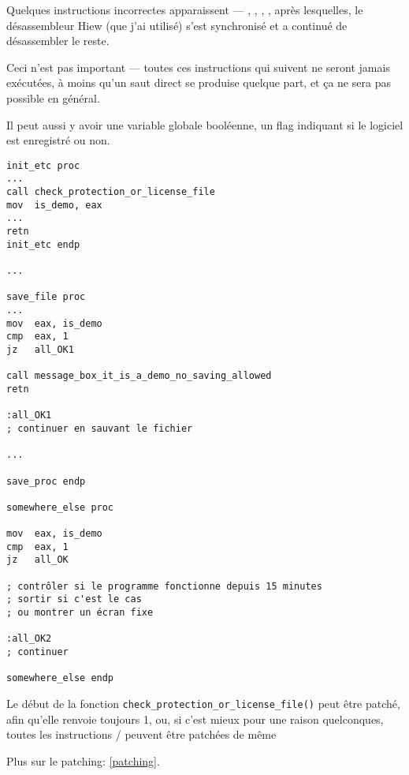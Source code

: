 Quelques instructions incorrectes apparaissent --- , , , ,
après lesquelles, le désassembleur Hiew (que j'ai utilisé) s'est synchronisé et
a continué de désassembler le reste.

Ceci n'est pas important --- toutes ces instructions qui suivent  ne
seront jamais exécutées, à moins qu'un saut direct se produise quelque part, et
ça ne sera pas possible en général.

\myhrule{}

Il peut aussi y avoir une variable globale booléenne, un flag indiquant si le
logiciel est enregistré ou non.

\begin{lstlisting}[style=customasmx86]
init_etc proc
...
call check_protection_or_license_file
mov  is_demo, eax
...
retn
init_etc endp

...

save_file proc
...
mov  eax, is_demo
cmp  eax, 1
jz   all_OK1

call message_box_it_is_a_demo_no_saving_allowed
retn

:all_OK1
; continuer en sauvant le fichier

...

save_proc endp

somewhere_else proc

mov  eax, is_demo
cmp  eax, 1
jz   all_OK

; contrôler si le programme fonctionne depuis 15 minutes
; sortir si c'est le cas
; ou montrer un écran fixe

:all_OK2
; continuer

somewhere_else endp
\end{lstlisting}

Le début de la fonction \verb|check_protection_or_license_file()| peut être patché,
afin qu'elle renvoie toujours 1, ou, si c'est mieux pour une raison quelconques,
toutes les instructions / peuvent être patchées de même

Plus sur le patching: \ref{patching}.
